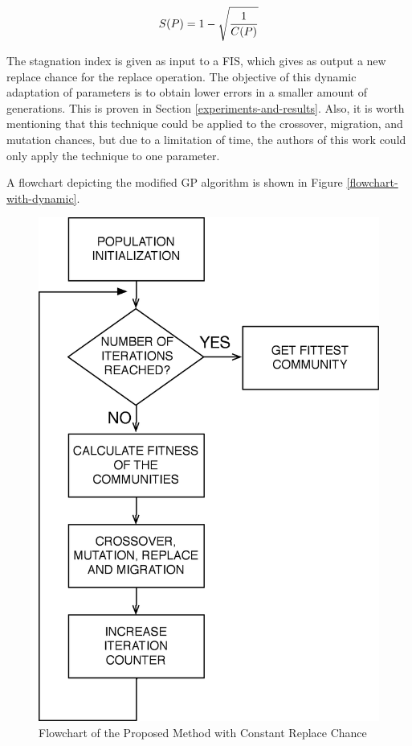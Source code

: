 \documentclass[a4paper,twoside]{article}
\begin{document}
\begin{equation} \label{si}
S(P) = 1 - \sqrt{1 \over C(P)}
\end{equation}

The stagnation index is given as input to a FIS, which gives as output a new replace chance for the replace operation. The objective of this dynamic adaptation of parameters is to obtain lower errors in a smaller amount of generations. This is proven in Section \ref{experiments-and-results}. Also, it is worth mentioning that this technique could be applied to the crossover, migration, and mutation chances, but due to a limitation of time, the authors of this work could only apply the technique to one parameter.

A flowchart depicting the modified GP algorithm is shown in Figure \ref{flowchart-with-dynamic}.

\begin{figure}[h!]
\begin{center}
\includegraphics[width=0.70\columnwidth]{figures/flowchart-without/flowchart-without}
\caption{{\label{flowchart-without-dynamic}Flowchart of the Proposed Method with Constant Replace Chance%
}}
\end{center}
\end{figure}
\end{document}
